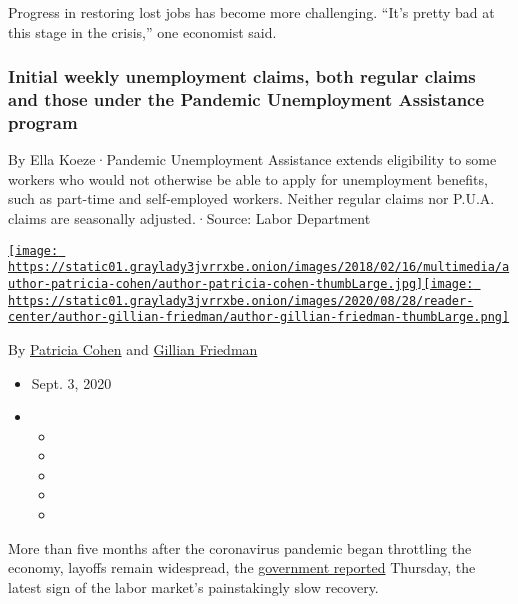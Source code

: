 Progress in restoring lost jobs has become more challenging. ``It's
pretty bad at this stage in the crisis,'' one economist said.

\hypertarget{initial-weekly-unemployment-claims-both-regular-claims-and-those-under-the-pandemic-unemployment-assistance-program}{%
\subsubsection{Initial weekly unemployment claims, both regular claims
and those under the Pandemic Unemployment Assistance
program}\label{initial-weekly-unemployment-claims-both-regular-claims-and-those-under-the-pandemic-unemployment-assistance-program}}

By Ella Koeze·Pandemic Unemployment Assistance extends eligibility to
some workers who would not otherwise be able to apply for unemployment
benefits, such as part-time and self-employed workers. Neither regular
claims nor P.U.A. claims are seasonally adjusted.·Source: Labor
Department

\href{https://www.nytimes3xbfgragh.onion/by/patricia-cohen}{\texttt{[image: https://static01.graylady3jvrrxbe.onion/images/2018/02/16/multimedia/author-patricia-cohen/author-patricia-cohen-thumbLarge.jpg]}}\href{http://nytimes3xbfgragh.onion/by/gillian-friedman}{\texttt{[image: https://static01.graylady3jvrrxbe.onion/images/2020/08/28/reader-center/author-gillian-friedman/author-gillian-friedman-thumbLarge.png]}}

By \href{https://www.nytimes3xbfgragh.onion/by/patricia-cohen}{Patricia
Cohen} and
\href{http://nytimes3xbfgragh.onion/by/gillian-friedman}{Gillian
Friedman}

\begin{itemize}
\item
  Sept. 3, 2020
\item
  \begin{itemize}
  \item
  \item
  \item
  \item
  \item
  \end{itemize}
\end{itemize}

More than five months after the coronavirus pandemic began throttling
the economy, layoffs remain widespread, the
\href{https://www.dol.gov/sites/dolgov/files/OPA/newsreleases/ui-claims/20201671.pdf}{government
reported} Thursday, the latest sign of the labor market's painstakingly
slow recovery.

